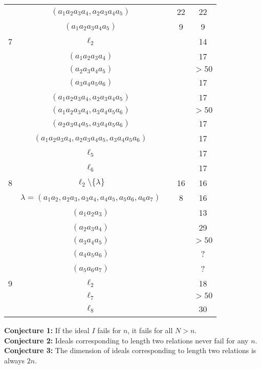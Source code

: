 \documentclass{article}
\begin{document}
\begin{flushleft}
\begin{center}
\begin{longtable}{|c|c|c|c|c|}
         & $(a_1a_2a_3a_4, a_2a_3a_4a_5)$ && 22 & 22\\
         & $(a_1a_2a_3a_4a_5)$ && 9 & 9\\
         \hline
         7 & $\ell_2$ &&& 14 \\
         & $(a_1a_2a_3a_4)$ &&& 17 \\
         \rowcolor{red!30!white}
         & $(a_2a_3a_4a_5)$ &&& $>50$ \\
         & $(a_3a_4a_5a_6)$ &&& 17 \\
         & $(a_1a_2a_3a_4, a_2a_3a_4a_5)$ &&& 17 \\
         \rowcolor{red!30!white}
         & $(a_1a_2a_3a_4, a_3a_4a_5a_6)$ &&& $>50$ \\
         & $(a_2a_3a_4a_5, a_3a_4a_5a_6)$ &&& 17 \\
         & $(a_1a_2a_3a_4, a_2a_3a_4a_5, a_3a_4a_5a_6)$ &&& 17 \\
         & $\ell_5$ &&& 17 \\
         & $\ell_6$ &&& 17 \\
         \hline
         8 & $\ell_2 \setminus \{\lambda\}$ && 16 & 16\\
         \rowcolor{blue!30!white}
         & $\lambda = (a_1a_2, a_2a_3, a_3a_4, a_4a_5, a_5a_6, a_6a_7)$ && 8 & 16 \\
         & $(a_1a_2a_3)$ &&& 13 \\
         & $(a_2a_3a_4)$ &&& 29 \\
         \rowcolor{red!30!white}
         & $(a_3a_4a_5)$ &&& $>50$ \\
         & $(a_4a_5a_6)$ &&&  ?\\
         & $(a_5a_6a_7)$ &&&  ?\\
         \hline
         9 & $\ell_2$ &&& 18 \\
           & $\ell_7$ &&& $>50$ \\
           & $\ell_8$ &&& 30 \\
      \end{longtable}
   \end{center}
   \textbf{Conjecture 1:} If the ideal $I$ fails for $n$, it fails for all $N > n$. \\
   \textbf{Conjecture 2:} Ideals corresponding to length two relations never fail for any $n$. \\
   \textbf{Conjecture 3:} The dimension of ideals corresponding to length two relations is always $2n$.
\end{flushleft}
\end{document}
